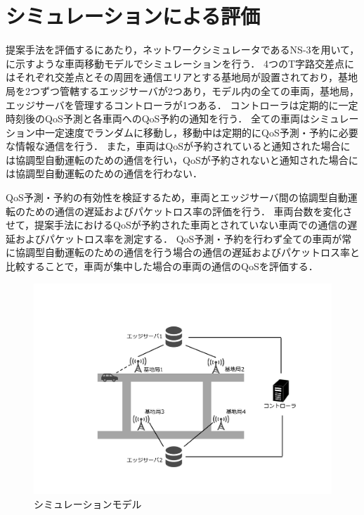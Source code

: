 \documentclass[a4paper,10pt,twocolumn,uplatex]{jsarticle}
\begin{document}
\section{シミュレーションによる評価}
\label{simulation}
提案手法を評価するにあたり，ネットワークシミュレータであるNS-3を用いて，に示すような車両移動モデルでシミュレーションを行う．
4つのT字路交差点にはそれぞれ交差点とその周囲を通信エリアとする基地局が設置されており，基地局を2つずつ管轄するエッジサーバが2つあり，モデル内の全ての車両，基地局，エッジサーバを管理するコントローラが1つある．
コントローラは定期的に一定時刻後のQoS予測と各車両へのQoS予約の通知を行う．
全ての車両はシミュレーション中一定速度でランダムに移動し，移動中は定期的にQoS予測・予約に必要な情報な通信を行う．
また，車両はQoSが予約されていると通知された場合には協調型自動運転のための通信を行い，QoSが予約されないと通知された場合には協調型自動運転のための通信を行わない．\par
QoS予測・予約の有効性を検証するため，車両とエッジサーバ間の協調型自動運転のための通信の遅延およびパケットロス率の評価を行う．
車両台数を変化させて，提案手法におけるQoSが予約された車両とされていない車両での通信の遅延およびパケットロス率を測定する．
QoS予測・予約を行わず全ての車両が常に協調型自動運転のための通信を行う場合の通信の遅延およびパケットロス率と比較することで，車両が集中した場合の車両の通信のQoSを評価する．

\begin{figure}[t]
	\begin{centering}
    \includegraphics[width=0.90\linewidth]{img/VirtualizationSimulationModel.pdf}
    \caption{シミュレーションモデル}
    \label{fig:model}
    \end{centering}
\end{figure}
\end{document}
